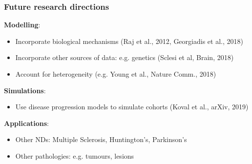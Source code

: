 \begin{frame}[label=current]
\frametitle{Future research directions}

\textbf{Modelling}:
\begin{itemize}
\item Incorporate biological mechanisms (Raj et al., 2012,  Georgiadis et al., 2018)
\item Incorporate other sources of data: e.g. genetics (Sclesi et al, Brain, 2018)
\item Account for heterogeneity (e.g. Young et al., Nature Comm., 2018)
\end{itemize}

\vfill

\textbf{Simulations}: 
\begin{itemize}
\item Use disease progression models to simulate cohorts (Koval et al., arXiv, 2019)
\end{itemize}

\vfill

\textbf{Applications}:
\begin{itemize}
\item Other NDs: Multiple Sclerosis, Huntington's, Parkinson's
\item Other pathologies: e.g. tumours, lesions
\end{itemize}

\end{frame}


% 
% 
% 
% 
% 
% 
% 


